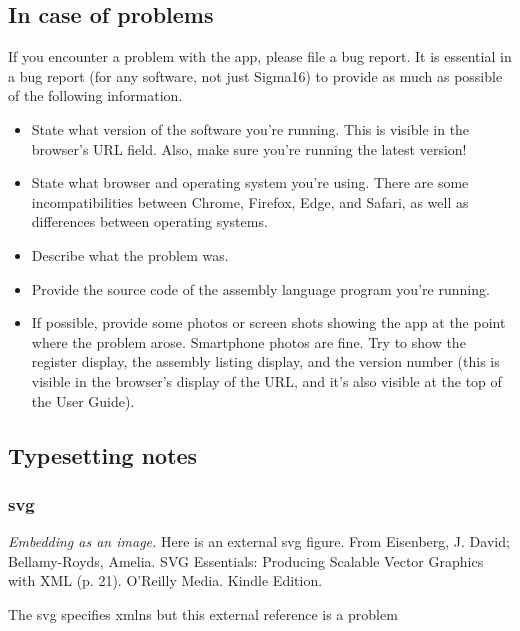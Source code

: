 \documentclass[11pt]{article}
\begin{document}
\subsection*{In case of problems}
\label{sec:org7b3980c}

If you encounter a problem with the app, please file a bug report.  It
is essential in a bug report (for any software, not just Sigma16) to
provide as much as possible of the following information.

\begin{itemize}
\item State what version of the software you’re running.  This is visible
in the browser's URL field.  Also, make sure you’re running the
latest version!

\item State what browser and operating system you're using.  There are
some incompatibilities between Chrome, Firefox, Edge, and Safari, as
well as differences between operating systems.

\item Describe what the problem was.

\item Provide the source code of the assembly language program you’re
running.

\item If possible, provide some photos or screen shots showing the app at
the point where the problem arose.  Smartphone photos are fine.  Try
to show the register display, the assembly listing display, and the
version number (this is visible in the browser's display of the URL,
and it's also visible at the top of the User Guide).
\end{itemize}

\subsection*{Typesetting notes}
\label{sec:orgb1ddeee}
\subsubsection*{svg}
\label{sec:orgaa30ab2}

\emph{Embedding as an image.} Here is an external svg figure.  From
Eisenberg, J. David; Bellamy-Royds, Amelia. SVG Essentials: Producing
Scalable Vector Graphics with XML (p. 21). O'Reilly Media. Kindle
Edition.

The svg specifies xmlns but this external reference is a problem
\end{document}
